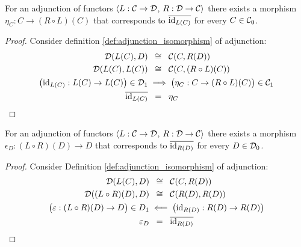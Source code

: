 \begin{theorem}
  For an adjunction of functors $\langle L: \mathcal{C} \to \mathcal{D}$, $R:\mathcal{D}\to \mathcal{C}\rangle$
  there exists a morphism ${\eta_C: C\to (R\circ L)(C)}$ that corresponds to
  $\overline{\mathrm{id}_{L(C)}}$ for every $C\in \mathcal{C}_0$.

  \begin{proof}
    Consider definition \ref{def:adjunction_isomorphism} of adjunction:
    \[
      \begin{aligned}
        \mathcal{D}(L(C), D) &\ \:\cong\ \: \mathcal{C}(C, R(D))\\
        \mathcal{D}(L(C), L(C)) &\ \:\cong\ \: \mathcal{C}(C, (R\circ L)(C))\\
        \big(\mathrm{id}_{L(C)}: L(C) \to L(C)\big) \in \mathcal{D}_1
        &\implies \big(\eta_C : C \to (R\circ L)(C)\big)\in \mathcal{C}_1\\
        \overline{\mathrm{id}_{L(C)}} &\ \:=\ \:\eta_C
      \end{aligned}
    \]
  \end{proof}
  \vspace{-\baselineskip}
\end{theorem}

\begin{theorem}
  For an adjunction of functors $\langle L: \mathcal{C} \to \mathcal{D}$, $R:\mathcal{D}\to \mathcal{C}\rangle$
  there exists a morphism ${\epsilon_D: (L\circ R)(D)\to D}$ that corresponds to
  $\overline{\mathrm{id}_{R(D)}}$ for every $D\in \mathcal{D}_0$.

  \begin{proof}
    Consider Definition \ref{def:adjunction_isomorphism} of adjunction:
    \[
      \begin{aligned}
        \mathcal{D}(L(C), D) &\ \:\cong\ \: \mathcal{C}(C, R(D))\\
        \mathcal{D}((L\circ R)(D), D) &\ \:\cong\ \: \mathcal{C}(R(D), R(D))\\
        \big(\varepsilon:(L\circ R)(D)\to D\big)\in D_1 &\impliedby
          \big(\mathrm{id}_{R(D)}: R(D) \to R(D)\big)\\
        \varepsilon_D &\ \:=\ \:\overline{\mathrm{id}_{R(D)}}
      \end{aligned}
    \]
  \end{proof}
  \vspace{-\baselineskip}
\end{theorem}